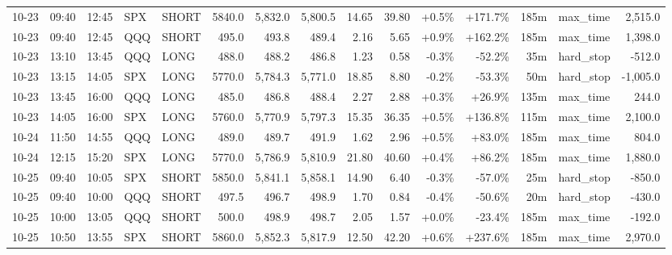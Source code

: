 \documentclass[11pt,a4paper,twoside]{article}
\begin{document}
\begin{landscape}
\begin{center}
\begin{longtable}{>{\color{txtmain}}l l l l l r r r r r r r r >{\color{txtmain}}l r}
10-23 & 09:40 & 12:45 & SPX & SHORT & 5840.0 & 5,832.0 & 5,800.5 & 14.65 & 39.80 & \textcolor{wingreen}{+0.5\%} & \textcolor{wingreen}{+171.7\%} & 185m & max\_time & \textcolor{wingreen}{2,515.0} \\
10-23 & 09:40 & 12:45 & QQQ & SHORT & 495.0 & 493.8 & 489.4 & 2.16 & 5.65 & \textcolor{wingreen}{+0.9\%} & \textcolor{wingreen}{+162.2\%} & 185m & max\_time & \textcolor{wingreen}{1,398.0} \\
10-23 & 13:10 & 13:45 & QQQ & LONG & 488.0 & 488.2 & 486.8 & 1.23 & 0.58 & \textcolor{lossred}{-0.3\%} & \textcolor{lossred}{-52.2\%} & 35m & hard\_stop & \textcolor{lossred}{-512.0} \\
10-23 & 13:15 & 14:05 & SPX & LONG & 5770.0 & 5,784.3 & 5,771.0 & 18.85 & 8.80 & \textcolor{lossred}{-0.2\%} & \textcolor{lossred}{-53.3\%} & 50m & hard\_stop & \textcolor{lossred}{-1,005.0} \\
10-23 & 13:45 & 16:00 & QQQ & LONG & 485.0 & 486.8 & 488.4 & 2.27 & 2.88 & \textcolor{wingreen}{+0.3\%} & \textcolor{wingreen}{+26.9\%} & 135m & max\_time & \textcolor{wingreen}{244.0} \\
10-23 & 14:05 & 16:00 & SPX & LONG & 5760.0 & 5,770.9 & 5,797.3 & 15.35 & 36.35 & \textcolor{wingreen}{+0.5\%} & \textcolor{wingreen}{+136.8\%} & 115m & max\_time & \textcolor{wingreen}{2,100.0} \\
10-24 & 11:50 & 14:55 & QQQ & LONG & 489.0 & 489.7 & 491.9 & 1.62 & 2.96 & \textcolor{wingreen}{+0.5\%} & \textcolor{wingreen}{+83.0\%} & 185m & max\_time & \textcolor{wingreen}{804.0} \\
10-24 & 12:15 & 15:20 & SPX & LONG & 5770.0 & 5,786.9 & 5,810.9 & 21.80 & 40.60 & \textcolor{wingreen}{+0.4\%} & \textcolor{wingreen}{+86.2\%} & 185m & max\_time & \textcolor{wingreen}{1,880.0} \\
10-25 & 09:40 & 10:05 & SPX & SHORT & 5850.0 & 5,841.1 & 5,858.1 & 14.90 & 6.40 & \textcolor{lossred}{-0.3\%} & \textcolor{lossred}{-57.0\%} & 25m & hard\_stop & \textcolor{lossred}{-850.0} \\
10-25 & 09:40 & 10:00 & QQQ & SHORT & 497.5 & 496.7 & 498.9 & 1.70 & 0.84 & \textcolor{lossred}{-0.4\%} & \textcolor{lossred}{-50.6\%} & 20m & hard\_stop & \textcolor{lossred}{-430.0} \\
10-25 & 10:00 & 13:05 & QQQ & SHORT & 500.0 & 498.9 & 498.7 & 2.05 & 1.57 & \textcolor{wingreen}{+0.0\%} & \textcolor{lossred}{-23.4\%} & 185m & max\_time & \textcolor{lossred}{-192.0} \\
10-25 & 10:50 & 13:55 & SPX & SHORT & 5860.0 & 5,852.3 & 5,817.9 & 12.50 & 42.20 & \textcolor{wingreen}{+0.6\%} & \textcolor{wingreen}{+237.6\%} & 185m & max\_time & \textcolor{wingreen}{2,970.0} \\

\end{longtable}
\end{center}
\end{landscape}
\end{document}
